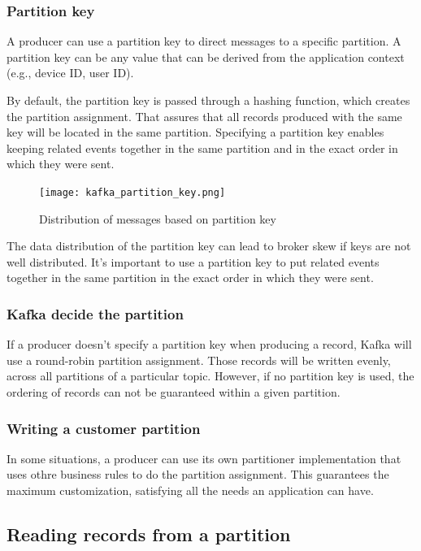 \subsubsection{Partition key}

A producer can use a partition key to direct messages to a specific partition.
A partition key can be any value that can be derived from the application
context (e.g., device ID, user ID).

By default, the partition key is passed through a hashing function, which
creates the partition assignment. That assures that all records produced with
the same key will be located in the same partition. Specifying a partition key
enables keeping related events together in the same partition and in the exact
order in which they were sent.

\begin{figure}[ht]
    \centering
    \texttt{[image: kafka\_partition\_key.png]}
    \caption{Distribution of messages based on partition key}
\end{figure}

The data distribution of the partition key can lead to broker skew if keys are
not well distributed. It's important to use a partition key to put related
events together in the same partition in the exact order in which they were
sent.

\subsubsection{Kafka decide the partition}

If a producer doesn't specify a partition key when producing a record, Kafka
will use a round-robin partition assignment. Those records will be written
evenly, across all partitions of a particular topic.
However, if no partition key is used, the ordering of records can not be
guaranteed within a given partition.

\subsubsection{Writing a customer partition}

In some situations, a producer can use its own partitioner implementation that
uses othre business rules to do the partition assignment.
This guarantees the maximum customization, satisfying all the needs an
application can have.

\subsection{Reading records from a partition}

